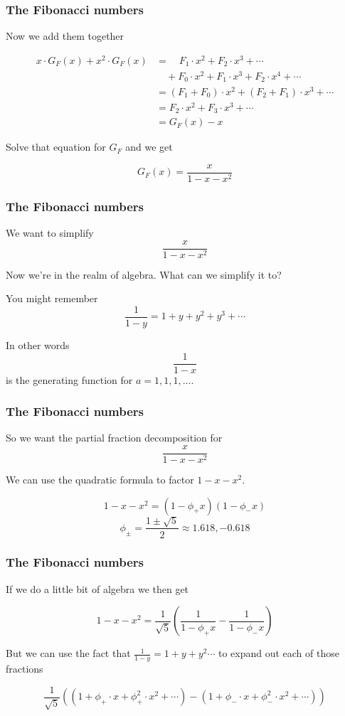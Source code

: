 \documentclass{beamer}
\begin{document}
\begin{frame}
    \frametitle{The Fibonacci numbers}

    Now we add them together

    \pause

    \begin{align*}
        x \cdot G_F(x) + x^2 \cdot G_F(x) &= \quad F_1 \cdot x^2 + F_2 \cdot x^3 + \cdots \\
        &\quad + F_0\cdot x^2 + F_1 \cdot x^3 + F_2 \cdot x^4 + \cdots \\
        &= (F_1 + F_0) \cdot x^2 + (F_2 + F_1) \cdot x^3 + \cdots \\
        &= F_2 \cdot x^2 + F_3 \cdot x^3 + \cdots \\
        &= G_F(x) - x
    \end{align*}

    \pause

    Solve that equation for $G_F$ and we get

    $$G_F(x) = \frac{x}{1 - x - x^2}$$
\end{frame}

\begin{frame}
    \frametitle{The Fibonacci numbers}

    We want to simplify $$\frac{x}{1 - x - x^2}$$ \pause

    Now we're in the realm of algebra. What can we simplify it to? \pause

    You might remember $$\frac{1}{1 - y} = 1 + y + y^2 + y^3 + \cdots $$ \pause

    In other words $$\frac{1}{1 - x}$$ is the generating function for $a = 1, 1, 1, \ldots $.

\end{frame}

\begin{frame}
    \frametitle{The Fibonacci numbers}

    So we want the partial fraction decomposition for $$\frac{x}{1 - x - x^2}$$ \pause

    We can use the quadratic formula to factor $1 - x - x^2$.

    $$1 - x - x^2 = (1 - \phi_+ x)(1 - \phi_- x)$$ $$ \phi_{\pm} = \frac{1 \pm \sqrt{5}}{2} \approx 1.618, -0.618$$

\end{frame}

\begin{frame}
    \frametitle{The Fibonacci numbers}

    If we do a little bit of algebra we then get

    $$1 - x - x^2 = \frac{1}{\sqrt{5}} \left( \frac{1}{1 - \phi_+ x} - \frac{1}{1 - \phi_- x }\right)$$ \pause

    But we can use the fact that $\frac{1}{1 - y} = 1 + y + y^2 \cdots $ to expand out each of those fractions

    $$\frac{1}{\sqrt{5}} \left(\left(1 + \phi_+ \cdot x + \phi_+^2 \cdot x^2 + \cdots \right) - \left(1 + \phi_- \cdot x + \phi_-^2 \cdot x^2 + \cdots \right)\right)$$

\end{frame}
\end{document}
